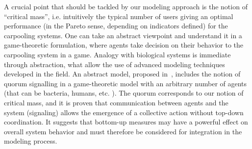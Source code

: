 A crucial point that should be tackled by our modeling approach is the notion of ``critical mass'', i.e. intuitively the typical number of users giving an optimal performance (in the Pareto sense, depending on indicators defined) for the carpooling systems. One can take an abstract viewpoint and understand it in a game-theoretic formulation, where agents take decision on their behavior to the carpooling system in a game. Analogy with biological systems is immediate through abstraction, what allow the use of advanced modeling techniques developed in the field. An abstract model, proposed in~\cite{10.1371/journal.pcbi.1004101}, includes the notion of quorum signalling in a game-theoretic model with an arbitrary number of agents (that can be bacteria, humans, etc. ). The quorum corresponds to our notion of critical mass, and it is proven that communication between agents and the system (signaling) allows the emergence of a collective action without top-down coordination. It suggests that bottom-up measures may have a powerful effect on overall system behavior and must therefore be considered for integration in the modeling process.






















